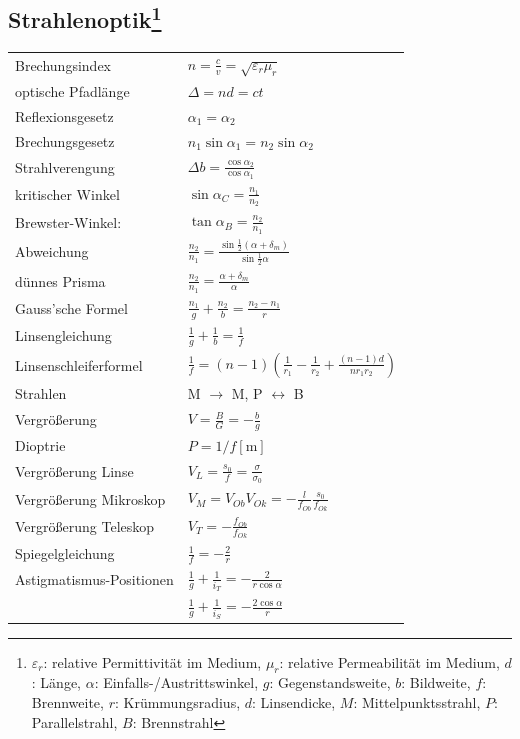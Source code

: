 \documentclass[12pt,a4paper]{article}
\renewcommand{\=}[1]{\stackrel{#1}{=}}
\newcommand{\eps}{\varepsilon}
\theoremstyle{definition}
\theoremstyle{remark}
\begin{document}
\subsection[Strahlenoptik]{Strahlenoptik\let\thefootnote\relax\footnote{$\eps_r$: relative Permittivität im Medium, $\mu_r$: relative Permeabilität im Medium, $d$: Länge, $\alpha$: Einfalls-/Austrittswinkel, $g$: Gegenstandsweite, $b$: Bildweite, $f$: Brennweite, $r$: Krümmungsradius, $d$: Linsendicke, $M$: Mittelpunktsstrahl, $P$: Parallelstrahl, $B$: Brennstrahl}}
\begin{center}
\begin{minipage}[t]{.58\linewidth}
\vspace{0pt}
\noindent\begin{tabular}{ll}
Brechungsindex & $n = \frac{c}{v} = \sqrt{\varepsilon_r \mu_r}$\\
optische Pfadlänge & $\Delta = nd = ct$\\
Reflexionsgesetz & $\alpha_1 = \alpha_2$\\
Brechungsgesetz & $n_1 \sin \alpha_1 = n_2 \sin \alpha_2$\\
Strahlverengung & $\Delta b = \frac{\cos \alpha_2}{\cos \alpha_1}$\\
kritischer Winkel & $\sin \alpha_C = \frac{n_1}{n_2}$\\
Brewster-Winkel: & $\tan \alpha_B = \frac{n_2}{n_1}$\\
Abweichung & $\frac{n_2}{n_1} = \frac{\sin \frac{1}{2}(\alpha + \delta_m)}{\sin \frac{1}{2} \alpha}$\\
dünnes Prisma & $\frac{n_2}{n_1} = \frac{\alpha + \delta_m}{\alpha}$\\
Gauss'sche Formel & $\frac{n_1}{g} + \frac{n_2}{b} = \frac{n_2 - n_1}{r}$\\
Linsengleichung & $\frac{1}{g} + \frac{1}{b} = \frac{1}{f}$\\
Linsenschleiferformel & $\frac{1}{f} = (n-1) (\frac{1}{r_1} - \frac{1}{r_2} + \frac{(n-1)d}{n r_1 r_2})$\\
Strahlen & M $\rightarrow$ M, P $\leftrightarrow$ B\\
Vergrößerung & $V = \frac{B}{G} = -\frac{b}{g}$\\
Dioptrie & $P = 1/f[\text{m}]$\\
Vergrößerung Linse & $V_L = \frac{s_0}{f} = \frac{\sigma}{\sigma_0}$\\
Vergrößerung Mikroskop & $V_M = V_{Ob} V_{Ok} = -\frac{l}{f_{Ob}} \frac{s_0}{f_{Ok}}$\\
Vergrößerung Teleskop & $V_T = -\frac{f_{Ob}}{f_{Ok}}$\\
Spiegelgleichung & $\frac{1}{f} = -\frac{2}{r}$\\
Astigmatismus-Positionen & $\frac{1}{g} + \frac{1}{i_T} = -\frac{2}{r \cos \alpha}$\\
 & $\frac{1}{g} + \frac{1}{i_S} = -\frac{2 \cos \alpha}{r}$\\
\end{tabular}


\end{minipage}
\end{center}
\end{document}
